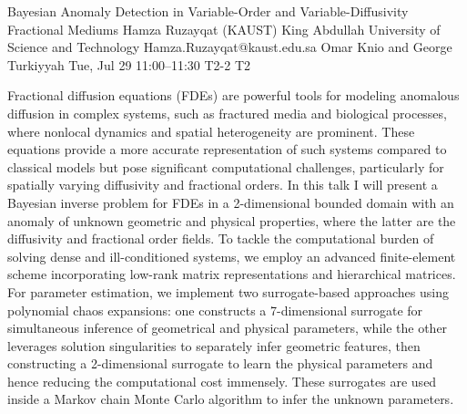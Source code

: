\begin{talk}
  {Bayesian Anomaly Detection in Variable-Order and Variable-Diffusivity Fractional Mediums}%
  {Hamza Ruzayqat}%
  {(KAUST) King Abdullah University of Science and Technology}%
  {Hamza.Ruzayqat@kaust.edu.sa}%
  {Omar Knio and George Turkiyyah}%
  {}%
  {Tue, Jul 29 11:00–11:30}%
  {T2-2}%
  {T2}%
  
				
			
Fractional diffusion equations (FDEs) are powerful tools for modeling anomalous diffusion in complex systems, such as fractured media and biological processes, where nonlocal dynamics and spatial heterogeneity are prominent. These equations provide a more accurate representation of such systems compared to classical models but pose significant computational challenges, particularly for spatially varying diffusivity and fractional orders. In this talk I will present a Bayesian inverse problem for FDEs in a 2-dimensional bounded domain with an anomaly of unknown geometric and physical properties, where the latter are the diffusivity and fractional order fields. To tackle the computational burden of solving dense and ill-conditioned systems, we employ an advanced finite-element scheme incorporating low-rank matrix representations and hierarchical matrices. For parameter estimation, we implement two surrogate-based approaches using polynomial chaos expansions: one constructs a 7-dimensional surrogate for simultaneous inference of geometrical and physical parameters, while the other leverages solution singularities to separately infer geometric features, then constructing a 2-dimensional surrogate to learn the physical parameters and hence reducing the computational cost immensely. These surrogates are used inside a Markov chain Monte Carlo algorithm to infer the unknown parameters.

\medskip

\end{talk}

